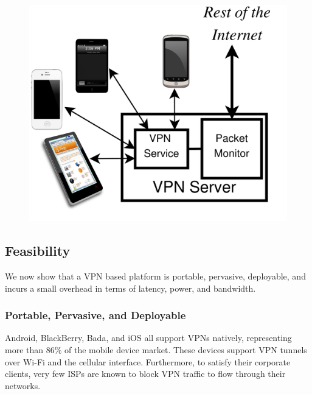 
\begin{figure}
\includegraphics[width=0.75\columnwidth]{figures/meddle-servers.pdf}
\caption{}
\label{fig:description}
\end{figure}

\subsection{Feasibility}

We now show that a VPN based platform is portable, pervasive, deployable,
and incurs a small overhead in terms of latency, power, and bandwidth. 

\subsubsection{Portable, Pervasive, and Deployable} 
Android, BlackBerry, Bada, and iOS all support VPNs natively, representing
more than 86\% of the mobile device market\cite{gartner-phone-share}. These
devices support VPN tunnels over Wi-Fi and the cellular interface.
Furthermore, to satisfy their corporate clients, very few ISPs are known to
block VPN traffic to flow through their networks.  

